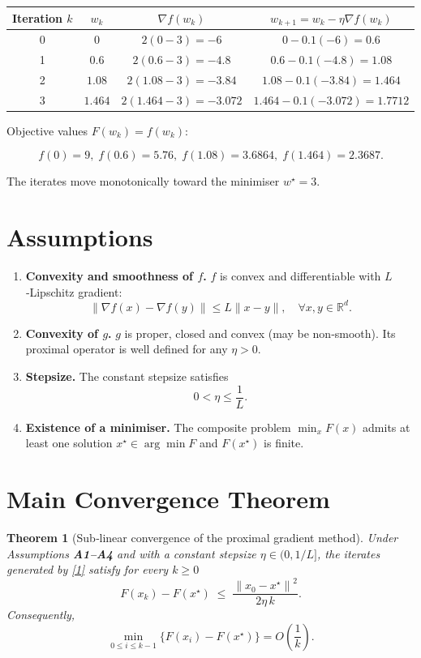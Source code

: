\documentclass{article}
\newtheorem{theorem}{Theorem}
\newcommand{\grad}{\nabla}
\newcommand{\R}{\mathbb{R}}
\newcommand{\norm}[1]{\left\|#1\right\|}
\begin{document}
\begin{center}
\begin{tabular}{c|c|c|c}
Iteration $k$ & $w_{k}$ & $\grad f(w_{k})$ & $w_{k+1}=w_{k}-\eta\grad f(w_{k})$\\\hline
0 & $0$ & $2(0-3)=-6$ & $0-0.1(-6)=0.6$\\
1 & $0.6$ & $2(0.6-3)=-4.8$ & $0.6-0.1(-4.8)=1.08$\\
2 & $1.08$ & $2(1.08-3)=-3.84$ & $1.08-0.1(-3.84)=1.464$\\
3 & $1.464$ & $2(1.464-3)=-3.072$ & $1.464-0.1(-3.072)=1.7712$
\end{tabular}
\end{center}

Objective values $F(w_{k})=f(w_{k})$:

\[
f(0)=9,\;f(0.6)=5.76,\;f(1.08)=3.6864,\;f(1.464)=2.3687.
\]

The iterates move monotonically toward the minimiser $w^{\star}=3$.

\newpage
\section*{Assumptions}
\begin{enumerate}[label=\textbf{A\arabic*.},leftmargin=*,itemsep=1ex]
\item \textbf{Convexity and smoothness of $f$.} $f$ is convex and differentiable with $L$‑Lipschitz gradient:
\[
\|\grad f(x)-\grad f(y)\|\le L\|x-y\|,\quad\forall x,y\in\R^{d}.
\tag{A1}
\]
\item \textbf{Convexity of $g$.} $g$ is proper, closed and convex (may be non‑smooth). Its proximal operator is well defined for any $\eta>0$.
\item \textbf{Stepsize.} The constant stepsize satisfies
\[
0<\eta\le \frac{1}{L}.
\tag{A3}
\]
\item \textbf{Existence of a minimiser.} The composite problem $\min_{x}F(x)$ admits at least one solution $x^{\star}\in\arg\min F$ and $F(x^{\star})$ is finite.
\end{enumerate}

\section*{Main Convergence Theorem}
\begin{theorem}[Sub‑linear convergence of the proximal gradient method]
\label{thm:main}
Under Assumptions \textbf{A1–A4} and with a constant stepsize $\eta\in(0,1/L]$, the iterates generated by \eqref{1} satisfy for every $k\ge0$
\begin{equation}
F(x_{k})-F(x^{\star})\;\le\;
\frac{\norm{x_{0}-x^{\star}}^{2}}{2\eta\,k}.
\tag{2}
\end{equation}
Consequently,
\[
\min_{0\le i\le k-1}\bigl\{F(x_{i})-F(x^{\star})\bigr\}=O\!\left(\frac{1}{k}\right).
\]
\end{theorem}
\end{document}
